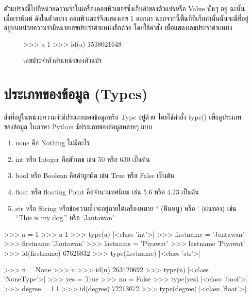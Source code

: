 ตัวแปรจะชี้ไปที่หน่วยความจำในเครื่องคอมพิวเตอร์ซึ่งเก็บค่าของตัวแปรหรือ Value นั้นๆ อยู่ ฉะนั้นเมื่อเราพิมพ์  ดังในตัวอย่าง คอมพิวเตอร์จึงแสดงเลข 1 ออกมา นอกจากนี้พื้นที่ที่เก็บค่านั้นนั้นจะมีที่อยู่อยู่บนหน่วยความจำมีหมายเลขประจำตำแหน่งอีกด้วย โดยใช้คำสั่ง  เพื่อแสดงเลขประจำตำแหน่ง

\begin{figure}[h]
\begin{pycode}
>>> a
1
>>> id(a)
1538021648
\end{pycode}
\caption{เลขประจำตัวตำแหน่งของตัวแปร}
\end{figure}

\section{ประเภทของข้อมูล (Types)}

สิ่งที่อยู่ในหน่วยความจำมีประเภทของข้อมูลหรือ Type อยู่ด้วย โดยใช้คำสั่ง type() เพื่อดูประเภทของข้อมูล ในภาษา Python มีประเภทของข้อมูลหลายๆ แบบ \cite{Luc15}

\begin{enumerate}[noitemsep]
\item none คือ Nothing ไม่มีอะไร 
\item int หรือ Integer คือตัวเลข เช่น 50 หรือ 630 เป็นต้น
\item bool หรือ Boolean คือค่าถูกผิด เช่น True หรือ False เป็นต้น
\item float หรือ floating Point คือจำนวนทศนิยม เช่น 5.6 หรือ 4.23 เป็นต้น
\item str หรือ String หรือข้อความซึ่งจะอยู่ภายใต้เครื่องหมาย `` (ฟันหนู) หรือ ` (ฝนทอง) เช่น ``This is my dog.''  หรือ `Jantawan'
\end{enumerate}

\begin{pycode}
>>> a = 1
>>> a
1
>>> type(a)
|<class \rq{}int\rq{}>|
>>> firstname = 'Jantawan'
>>> firstname
'Jantawan'
>>> lastname = 'Piyawat'
>>> lastname
'Piyawat'
>>> id(firstname)
67626832
>>> type(firstname)
|<class \rq{}str\rq{}>|
\end{pycode}


\begin{pycode}
>>> n = None
>>> n
>>> id(n)
263420692
>>> type(n)
|<class \rq{}NoneType\rq{}>|
>>> yes = True
>>> no = False
>>> type(yes)
|<class \rq{}bool\rq{}>|
>>> degree = 1.1
>>> id(degree)
72213072
>>> type(degree)
|<class \rq{}float\rq{}>|


\end{pycode}


